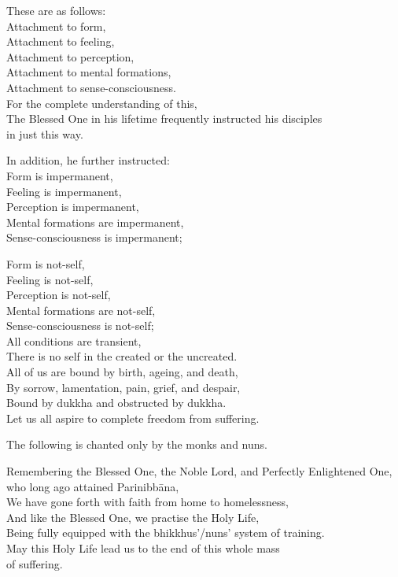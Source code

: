 These are as follows:\\
Attachment to form,\\
Attachment to feeling,\\
Attachment to perception,\\
Attachment to mental formations,\\
Attachment to sense-consciousness.\\
For the complete understanding of this,\\
The Blessed One in his lifetime frequently instructed his disciples \\in just this way.

In addition, he further instructed:\\
Form is impermanent,\\
Feeling is impermanent,\\
Perception is impermanent,\\
Mental formations are impermanent,\\
Sense-consciousness is impermanent;

Form is not-self,\\
Feeling is not-self,\\
Perception is not-self,\\
Mental formations are not-self,\\
Sense-consciousness is not-self;\\
All conditions are transient,\\
There is no self in the created or the uncreated.\\
All of us are bound by birth, ageing, and death,\\
By sorrow, lamentation, pain, grief, and despair,\\
Bound by dukkha and obstructed by dukkha.\\
Let us all aspire to complete freedom from suffering.

\begin{instruction}
  The following is chanted only by the monks and nuns.
\end{instruction}

Remembering the Blessed One, the Noble Lord, and Perfectly Enlightened One, who long ago attained Parinibbāna,\\
We have gone forth with faith from home to homelessness,\\
And like the Blessed One, we practise the Holy Life,\\
Being fully equipped with the bhikkhus'/nuns' system of training.\\
May this Holy Life lead us to the end of this whole mass\\ of suffering.\\

